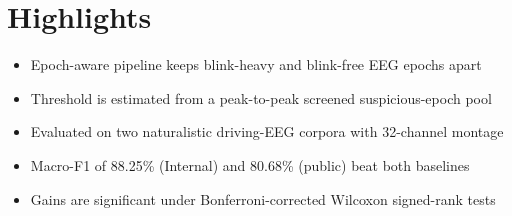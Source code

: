 \documentclass[12pt]{article}
\begin{document}
\section*{Highlights}
\begin{itemize}
\item Epoch-aware pipeline keeps blink-heavy and blink-free EEG epochs apart
\item Threshold is estimated from a peak-to-peak screened suspicious-epoch pool
\item Evaluated on two naturalistic driving-EEG corpora with 32-channel montage
\item Macro-F1 of 88.25\% (Internal) and 80.68\% (public) beat both baselines
\item Gains are significant under Bonferroni-corrected Wilcoxon signed-rank tests
\end{itemize}
\end{document}
